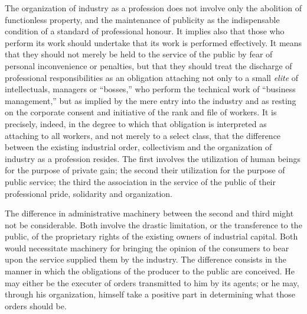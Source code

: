 \documentclass{book}
\begin{document}
The organization of industry as a profession does not involve only the abolition of functionless property, and the maintenance of publicity as the indispensable condition of a standard of professional honour. It implies also that those who perform its work should undertake that its work is performed effectively. It means that they should not merely be held to the service of the public by fear of personal inconvenience or penalties, but that they should treat the discharge of professional responsibilities as an obligation attaching not only to a small \emph{elite} of intellectuals, managers or “bosses,” who perform the technical work of “business management,” but as implied by the mere entry into the industry and as resting on the corporate consent and initiative of the rank and file of workers. It is precisely, indeed, in the degree to which that obligation is interpreted as attaching to all workers, and not merely to a select class, that the difference between the existing industrial order, collectivism and the organization of industry as a profession resides. The first involves the utilization of human beings for the purpose of private gain; the second their utilization for the purpose of public service; the third the association in the service of the public of their professional pride, solidarity and organization.

The difference in administrative machinery between the second and third might not be considerable. Both involve the drastic limitation, or the transference to the public, of the proprietary rights of the existing owners of industrial capital. Both would necessitate machinery for bringing the opinion of the consumers to bear upon the service supplied them by the industry. The difference consists in the manner in which the obligations of the producer to the public are conceived. He may either be the executer of orders transmitted to him by its agents; or he may, through his organization, himself take a positive part in determining what those orders should be.
\end{document}
